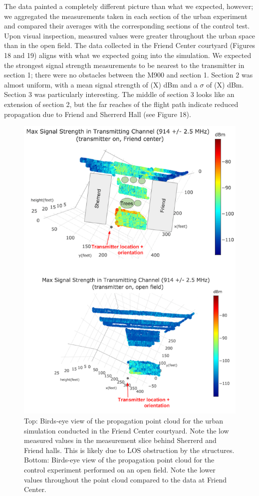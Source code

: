 \documentclass[pageno]{jpaper}
\begin{document}
The data painted a completely different picture than what we expected, however; we aggregated the measurements taken in each section of the urban experiment and compared their averages with the corresponding sections of the control test. Upon visual inspection, measured values were greater throughout the urban space than in the open field. The data collected in the Friend Center courtyard (Figures 18 and 19) aligns with what we expected going into the simulation. We expected the strongest signal strength measurements to be nearest to the transmitter in section 1; there were no obstacles between the M900 and section 1. Section 2 was almost uniform, with a mean signal strength of (X) dBm and a $\sigma$ of (X) dBm. Section 3 was particularly interesting. The middle of section 3 looks like an extension of section 2, but the far reaches of the flight path indicate reduced propagation due to Friend and Sherrerd Hall (see Figure 18). 
\begin{figure}
	\caption{Top: Birds-eye view of the propagation point cloud for the urban simulation conducted in the Friend Center courtyard. Note the low measured values in the measurement slice behind Sherrerd and Friend halls. This is likely due to LOS obstruction by the structures. Bottom: Birds-eye view of the propagation point cloud for the control experiment performed on an open field. Note the lower values throughout the point cloud compared to the data at Friend Center. }
	\centerline{\includegraphics{friend_3}}
\end{figure}
\end{document}

